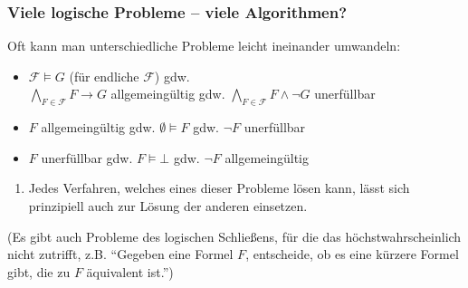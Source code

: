 \documentclass[aspectratio=1610,onlymath]{beamer}
\let\beameroriginaldoublebackslash\\
\let\\=\beameroriginaldoublebackslash
\begin{document}
\begin{frame}\frametitle{Viele logische Probleme -- viele Algorithmen?}

Oft kann man unterschiedliche Probleme leicht ineinander umwandeln:
\medskip

\begin{itemize}
\item $\mathcal{F}\models G$ (für endliche $\mathcal{F}$) \alert{gdw.}\\ $\bigwedge_{F\in\mathcal{F}}F\to G$ allgemeingültig \alert{gdw.} $\bigwedge_{F\in\mathcal{F}}F\wedge\neg G$ unerfüllbar
\item $F$ allgemeingültig \alert{gdw.} $\emptyset\models F$ \alert{gdw.} $\neg F$ unerfüllbar
\item $F$ unerfüllbar \alert{gdw.} $F\models \bot$ \alert{gdw.} $\neg F$ allgemeingültig
\end{itemize}
\begin{enumerate}[$\leadsto$]
\item Jedes Verfahren, welches eines dieser Probleme lösen kann, lässt sich prinzipiell auch zur Lösung der anderen einsetzen.
\end{enumerate}

{\footnotesize\textcolor{devilscss}{%
(Es gibt auch Probleme des logischen Schließens, für die das höchstwahrscheinlich nicht zutrifft, z.B. "`Gegeben eine Formel $F$, entscheide, ob es eine kürzere Formel gibt, die zu $F$ äquivalent ist."')}
}

\end{frame}
\end{document}
